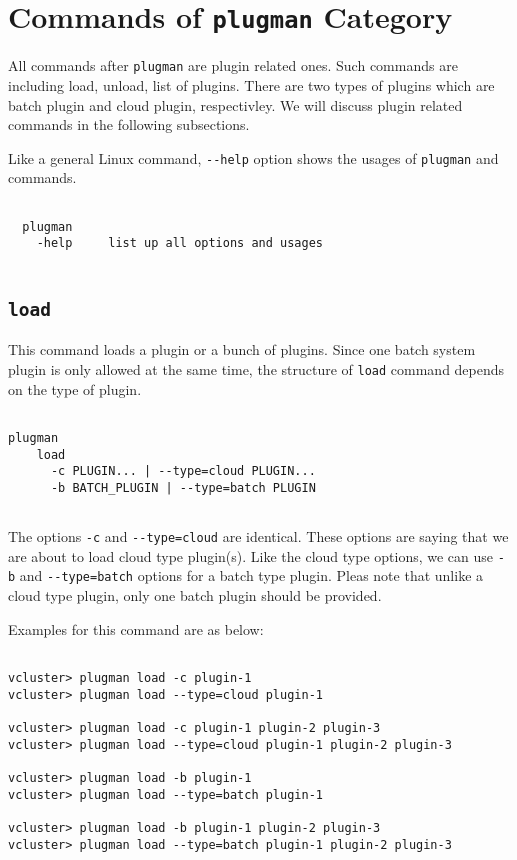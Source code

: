 \documentclass[11pt]{article}
\def \ttt{\texttt}
\def \vb{\verb}
\begin{document}
\newpage

\section{Commands of \ttt{plugman} Category}

All commands after \vb+plugman+ are plugin related ones. Such commands are including load, unload, list of plugins. There are two types of plugins which are batch plugin and cloud plugin, respectivley. We will discuss plugin related commands in the following subsections.

Like a general Linux command, \vb+--help+ option shows the usages of \vb+plugman+ and commands.

\begin{Verbatim}[fontfamily=courier, fontsize = \small, obeytabs
=true, tabsize=4, frame=lines]

  plugman 
    -help     list up all options and usages
  
\end{Verbatim}


\subsection{\ttt{load}}
This command loads a plugin or a bunch of plugins. Since one batch system plugin is only allowed at the same time, the structure of \vb+load+ command depends on the type of plugin.  

\begin{Verbatim}[fontfamily=courier, fontsize = \small, obeytabs
=true, tabsize=4, frame=lines]

plugman 
    load
      -c PLUGIN... | --type=cloud PLUGIN... 
      -b BATCH_PLUGIN | --type=batch PLUGIN
      
\end{Verbatim}


The options \vb+-c+ and \vb+--type=cloud+ are identical. These options are saying that we are about to load cloud type plugin(s). Like the cloud type options, we can use \vb+-b+ and \vb+--type=batch+ options for a batch type plugin. Pleas note that unlike a cloud type plugin, only one batch plugin should be provided.

Examples for this command are as below:


\begin{Verbatim}[fontfamily=courier, fontsize = \small, obeytabs
=true, tabsize=4, frame=lines]

vcluster> plugman load -c plugin-1
vcluster> plugman load --type=cloud plugin-1

vcluster> plugman load -c plugin-1 plugin-2 plugin-3
vcluster> plugman load --type=cloud plugin-1 plugin-2 plugin-3

vcluster> plugman load -b plugin-1
vcluster> plugman load --type=batch plugin-1

vcluster> plugman load -b plugin-1 plugin-2 plugin-3
vcluster> plugman load --type=batch plugin-1 plugin-2 plugin-3

\end{Verbatim}
\end{document}
